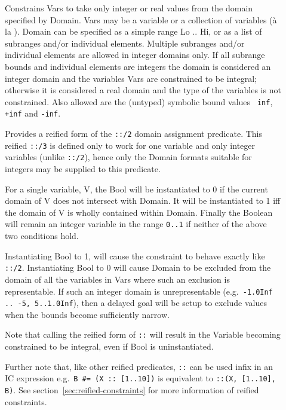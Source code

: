 \begin{description}

\item []
Constrains Vars to take only integer or real values from the domain
specified by Domain.  Vars may be a variable or a collection of variables
(\`a la
).
Domain can be specified as a simple range Lo .. Hi, or as a list
of subranges and/or individual elements.  Multiple subranges and/or
individual elements are allowed in integer domains only.  If all subrange
bounds and individual elements are integers the domain is considered an
integer domain and the variables Vars are constrained to be integral;
otherwise it is considered a real domain and the type of the variables is
not constrained.  Also allowed are the (untyped) symbolic bound values {\tt
inf}, {\tt +inf} and {\tt -inf}.

\item []

Provides a reified form of the {\tt ::/2} domain assignment predicate.  This
reified {\tt ::/3} is defined only to work for one variable and only integer
variables (unlike {\tt ::/2}), hence only the Domain formats suitable for
integers may be supplied to this predicate.

For a single variable, V, the Bool will be instantiated to 0 if the
current domain of V does not intersect with Domain.  It will be
instantiated to 1 iff the domain of V is wholly contained within
Domain.  Finally the Boolean will remain an integer variable in the
range {\tt 0..1} if neither of the above two conditions hold.

Instantiating Bool to 1, will cause the constraint to behave exactly
like {\tt ::/2}.  Instantiating Bool to 0 will cause Domain to be
excluded from the domain of all the variables in Vars where such an
exclusion is representable.  If such an integer domain is
unrepresentable (e.g.\ {\tt -1.0Inf .. -5, 5..1.0Inf}), then a delayed
goal will be setup to exclude values when the bounds become
sufficiently narrow.

Note that calling the reified form of {\tt ::} will result in the
Variable becoming constrained to be integral, even if Bool is
uninstantiated.

Further note that, like other reified predicates, {\tt ::} can be used
infix in an IC expression e.g.\ {\tt B \#= (X :: [1..10])} is equivalent
to {\tt ::(X, [1..10], B)}. See section~\ref{sec:reified-constraints}
for more information of reified constraints.


\end{description}
